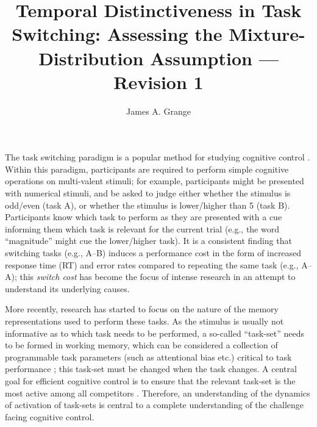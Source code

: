 \documentclass[a4paper, man, natbib]{apa6}
\title{Temporal Distinctiveness in Task Switching: Assessing the Mixture-Distribution Assumption --- Revision 1}
\author{James A. Grange}
\affiliation{School of Psychology, Keele University, UK}
\begin{document}
\maketitle

The task switching paradigm is a popular method for studying cognitive control \citep{Grange2014a, Kiesel2010, Vandierendonck2010}. Within this paradigm, participants are required to perform simple cognitive operations on multi-valent stimuli; for example, participants might be presented with numerical stimuli, and be asked to judge either whether the stimulus is odd/even (task A), or whether the stimulus is lower/higher than 5 (task B). Participants know which task to perform as they are presented with a cue informing them which task is relevant for the current trial (e.g., the word ``magnitude'' might cue the lower/higher task). It is a consistent finding that switching tasks (e.g., A--B) induces a performance cost in the form of increased response time (RT) and error rates compared to repeating the same task (e.g., A--A); this \emph{switch cost} has become the focus of intense research in an attempt to understand its underlying causes. 

More recently, research has started to focus on the nature of the memory representations used to perform these tasks. As the stimulus is usually not informative as to which task needs to be performed, a so-called ``task-set'' needs to be formed in working memory, which can be considered a collection of programmable task parameters (such as attentional bias etc.) critical to task performance \citep{Logan2001}; this task-set must be changed when the task changes. A central goal for efficient cognitive control is to ensure that the relevant task-set is the most active among all competitors \citep[e.g.,][]{Altmann2008}. Therefore, an understanding of the dynamics of activation of task-sets is central to a complete understanding of the challenge facing cognitive control.
\end{document}
